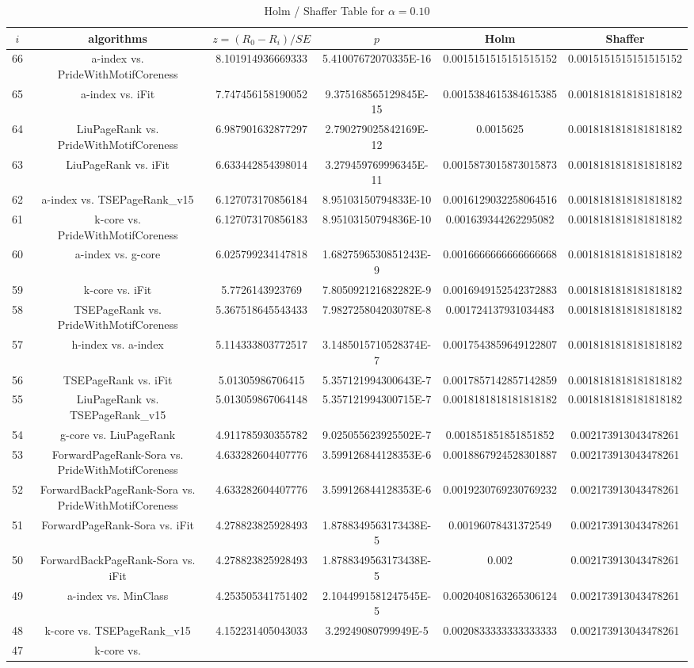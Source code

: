 \documentclass[a4paper,10pt]{article}
\begin{document}
\begin{landscape}
\begin{table}[!htp]
\centering\tiny
\caption{Holm / Shaffer Table for $\alpha=0.10$}
\begin{tabular}{cccccc}
$i$&algorithms&$z=(R_0 - R_i)/SE$&$p$&Holm&Shaffer\\
\hline
66&a-index vs. PrideWithMotifCoreness&8.101914936669333&5.41007672070335E-16&0.0015151515151515152&0.0015151515151515152\\65&a-index vs. iFit&7.747456158190052&9.375168565129845E-15&0.0015384615384615385&0.0018181818181818182\\64&LiuPageRank vs. PrideWithMotifCoreness&6.987901632877297&2.790279025842169E-12&0.0015625&0.0018181818181818182\\63&LiuPageRank vs. iFit&6.633442854398014&3.279459769996345E-11&0.0015873015873015873&0.0018181818181818182\\62&a-index vs. TSEPageRank_v15&6.127073170856184&8.95103150794833E-10&0.0016129032258064516&0.0018181818181818182\\61&k-core vs. PrideWithMotifCoreness&6.127073170856183&8.95103150794836E-10&0.001639344262295082&0.0018181818181818182\\60&a-index vs. g-core&6.025799234147818&1.6827596530851243E-9&0.0016666666666666668&0.0018181818181818182\\59&k-core vs. iFit&5.7726143923769&7.805092121682282E-9&0.0016949152542372883&0.0018181818181818182\\58&TSEPageRank vs. PrideWithMotifCoreness&5.367518645543433&7.982725804203078E-8&0.001724137931034483&0.0018181818181818182\\57&h-index vs. a-index&5.114333803772517&3.1485015710528374E-7&0.0017543859649122807&0.0018181818181818182\\56&TSEPageRank vs. iFit&5.01305986706415&5.357121994300643E-7&0.0017857142857142859&0.0018181818181818182\\55&LiuPageRank vs. TSEPageRank_v15&5.013059867064148&5.357121994300715E-7&0.0018181818181818182&0.0018181818181818182\\54&g-core vs. LiuPageRank&4.911785930355782&9.025055623925502E-7&0.001851851851851852&0.002173913043478261\\53&ForwardPageRank-Sora vs. PrideWithMotifCoreness&4.633282604407776&3.599126844128353E-6&0.0018867924528301887&0.002173913043478261\\52&ForwardBackPageRank-Sora vs. PrideWithMotifCoreness&4.633282604407776&3.599126844128353E-6&0.0019230769230769232&0.002173913043478261\\51&ForwardPageRank-Sora vs. iFit&4.278823825928493&1.8788349563173438E-5&0.00196078431372549&0.002173913043478261\\50&ForwardBackPageRank-Sora vs. iFit&4.278823825928493&1.8788349563173438E-5&0.002&0.002173913043478261\\49&a-index vs. MinClass&4.253505341751402&2.1044991581247545E-5&0.0020408163265306124&0.002173913043478261\\48&k-core vs. TSEPageRank_v15&4.152231405043033&3.29249080799949E-5&0.0020833333333333333&0.002173913043478261\\47&k-core vs. 
\end{tabular}
\end{table}
\end{landscape}
\end{document}
